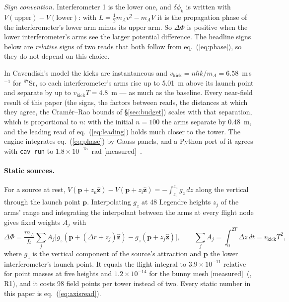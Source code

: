 \documentclass[10pt,a4paper]{article}
\newcommand{\tagM}{\textsf{\small[measured]}}
\begin{document}
\emph{Sign convention.} Interferometer 1 is the lower one, and $\delta\phi_k$ is written with
$V(\text{upper})-V(\text{lower})$: with $L=\frac12m_Av^2-m_AV$ it is the propagation phase of the
interferometer's lower arm minus its upper arm. So $\Delta\Phi$ is positive when the lower interferometer's arms see the larger
potential difference. The headline signs below are \emph{relative} signs of two reads that both
follow from eq.~(\ref{eq:phase}), so they do not depend on this choice.

In Cavendish's model the kicks are instantaneous and $v_\mathrm{kick} = n\hbar k/m_A =
6.58$~m\,s$^{-1}$ for $^{87}$Sr, so each interferometer's arms rise up to 5.01~m above its launch point
and separate by up to $v_\mathrm{kick}T = 4.8$~m --- as much as the baseline. Every near-field result
of this paper (the signs, the factors between reads, the distances at which they agree, the
Cram\'er--Rao bounds of \S\ref{sec:budget}) scales with that separation, which is proportional to $n$:
with the initial $n=100$ the arms separate by 0.48~m, and the leading read of eq.~(\ref{eq:leading})
holds much closer to the tower. The engine integrates eq.~(\ref{eq:phase}) by
Gauss panels, and a Python port of it agrees with \texttt{cav run} to $1.8\times10^{-15}$~rad
\tagM\ \citep[C1]{paperflight}.

\paragraph{Static sources.} For a source at rest, $V(\mathbf{p}+z_\mathrm{u}\hat{\mathbf z}) -
V(\mathbf{p}+z_\mathrm{l}\hat{\mathbf z}) = -\int_{z_\mathrm{l}}^{z_\mathrm{u}} g_z\,dz$ along the
vertical through the launch point $\mathbf{p}$. Interpolating $g_z$ at 48 Legendre heights $z_j$ of
the arms' range and integrating the interpolant between the arms at every flight node gives fixed
weights $A_j$ with
\begin{equation}
\Delta\Phi = \frac{m_A}{\hbar}\sum_j A_j\bigl[g_z(\mathbf{p}+(\Delta r+z_j)\hat{\mathbf z}) -
g_z(\mathbf{p}+z_j\hat{\mathbf z})\bigr],\qquad \sum_jA_j = \int_0^{2T}\!\Delta z\,dt = v_\mathrm{kick}T^2,
\label{eq:axisread}
\end{equation}
where $g_z$ is the vertical component of the source's attraction and $\mathbf{p}$ the lower
interferometer's launch point. It equals the flight integral to $3.9\times10^{-11}$ relative for point
masses at five heights and $1.2\times10^{-14}$ for the bunny mesh \tagM\ (\citealp{paperrealread},
R1), and it costs 98 field points per tower instead of two. Every static number in this paper is
eq.~(\ref{eq:axisread}).
\end{document}
